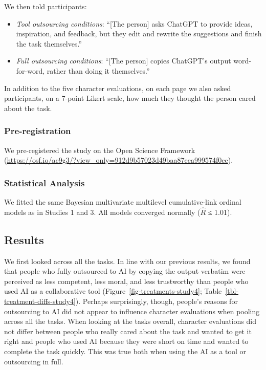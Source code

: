 \documentclass[
  man,
  floatsintext,
  longtable,
  nolmodern,
  notxfonts,
  notimes,
  colorlinks=true,linkcolor=blue,citecolor=blue,urlcolor=blue]{apa7}
\providecommand{\tightlist}{%
  \setlength{\itemsep}{0pt}\setlength{\parskip}{0pt}}
\begin{document}
We then told participants:

\begin{itemize}
\tightlist
\item
  \emph{Tool outsourcing conditions}: ``{[}The person{]} asks ChatGPT to
  provide ideas, inspiration, and feedback, but they edit and rewrite
  the suggestions and finish the task themselves.''
\item
  \emph{Full outsourcing conditions}: ``{[}The person{]} copies
  ChatGPT's output word-for-word, rather than doing it themselves.''
\end{itemize}

In addition to the five character evaluations, on each page we also
asked participants, on a 7-point Likert scale, how much they thought the
person cared about the task.

\subsubsection*{Pre-registration}\label{pre-registration-3}

We pre-registered the study on the Open Science Framework
(\url{https://osf.io/ac9g3/?view_only=912d9b57023d49baa87eea999574f0ce}).

\subsubsection*{Statistical Analysis}\label{statistical-analysis-3}

We fitted the same Bayesian multivariate multilevel cumulative-link
ordinal models as in Studies 1 and 3. All models converged normally
(\(\hat{R}\) ≤ 1.01).

\subsection*{Results}\label{results-3}

We first looked across all the tasks. In line with our previous results,
we found that people who fully outsourced to AI by copying the output
verbatim were perceived as less competent, less moral, and less
trustworthy than people who used AI as a collaborative tool
(Figure~\ref{fig-treatments-study4};
Table~\ref{tbl-treatment-diffs-study4}). Perhaps surprisingly, though,
people's reasons for outsourcing to AI did not appear to influence
character evaluations when pooling across all the tasks. When looking at
the tasks overall, character evaluations did not differ between people
who really cared about the task and wanted to get it right and people
who used AI because they were short on time and wanted to complete the
task quickly. This was true both when using the AI as a tool or
outsourcing in full.
\end{document}
